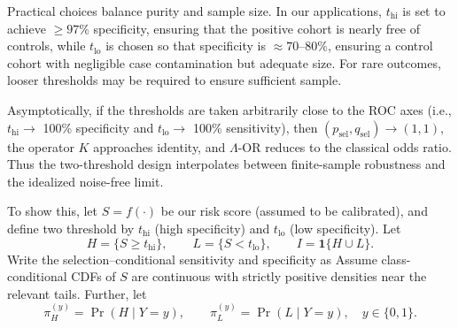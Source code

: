 \documentclass[lineno]{biometrika}
\begin{document}
Practical choices balance purity and sample size. In our applications, 
$t_{\mathrm{hi}}$ is set to achieve $\geq 97\%$ specificity, ensuring that the 
positive cohort is nearly free of controls, while $t_{\mathrm{lo}}$ is chosen 
so that specificity is $\approx 70$--$80\%$, ensuring a control cohort with 
negligible case contamination but adequate size. For rare outcomes, looser 
thresholds may be required to ensure sufficient sample. 

Asymptotically, if the thresholds are taken arbitrarily close to the ROC axes 
(i.e., $t_{\mathrm{hi}} \to$ 100\% specificity and $t_{\mathrm{lo}} \to$ 100\% 
sensitivity), then $(p_{\text{sel}}, q_{\text{sel}}) \to (1,1)$, the operator 
$K$ approaches identity, and $\Lambda$-OR reduces to the classical odds ratio. 
Thus the two-threshold design interpolates between finite-sample robustness and the 
idealized noise-free limit.

To show this, let $S=f(\cdot)$ be our risk score (assumed to be  calibrated), and define two threshold by
$t_{\mathrm{hi}}$ (high specificity) and $t_{\mathrm{lo}}$ (low specificity). Let
\[
H=\{S\ge t_{\mathrm{hi}}\},\qquad L=\{S<t_{\mathrm{lo}}\},\qquad I=\mathbf{1}\{H\cup L\}.
\]
Write the selection–conditional sensitivity and specificity as
%
Assume class-conditional CDFs of $S$ are continuous with strictly positive densities near the relevant tails. Further, let
\[
\pi_H^{(y)}=\Pr(H\mid Y=y),\qquad \pi_L^{(y)}=\Pr(L\mid Y=y),\quad y\in\{0,1\}.
\]
\end{document}
